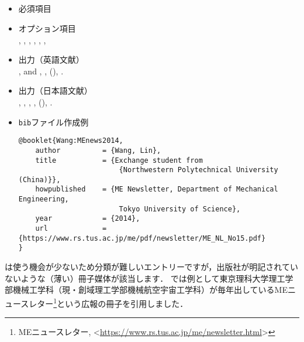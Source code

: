 \documentclass[a4paper,fleqn,uplatex,dvipdfmx]{jsarticle}
\begin{document}
\subsection{\ttbooklet}
\label{ssec:booklet}
\begin{screen}
    \begin{itemize}
        \item 必須項目 \\
        \tttitle
        \item オプション項目 \\
        \ttauthor, \tthowpublished, \ttaddress, \ttmonth, \ttyear, \ttnote, \ttkey
        \item 出力（英語文献） \\
            \colorbox[gray]{0.8}{\ttauthorf}, \colorbox[gray]{0.8}{\ttauthors} and \colorbox[gray]{0.8}{\ttauthort}, \colorbox[gray]{0.8}{\tttitle}, \colorbox[gray]{0.8}{\tthowpublished} (\colorbox[gray]{0.8}{\ttyear}), \colorbox[gray]{0.8}{\ttnote}.
        \item 出力（日本語文献） \\
            \colorbox[gray]{0.8}{\ttauthorf}, \colorbox[gray]{0.8}{\ttauthors}, \colorbox[gray]{0.8}{\ttauthort}, \colorbox[gray]{0.8}{\tttitle}, \colorbox[gray]{0.8}{\tthowpublished} (\colorbox[gray]{0.8}{\ttyear}), \colorbox[gray]{0.8}{\ttnote}.
        \item \verb|bib|ファイル作成例 \vspace{-3mm}
\begin{verbatim}
@booklet{Wang:MEnews2014,
    author          = {Wang, Lin},
    title           = {Exchange student from 
                        {Northwestern Polytechnical University (China)}},
    howpublished    = {ME Newsletter, Department of Mechanical Engineering, 
                        Tokyo University of Science},
    year            = {2014},
    url             = {https://www.rs.tus.ac.jp/me/pdf/newsletter/ME_NL_No15.pdf}
}
\end{verbatim}
    \end{itemize}
\end{screen}

\ttbooklet は使う機会が少ないため分類が難しいエントリーですが，出版社が明記されていないような（薄い）冊子媒体が該当します．
\JSMErepos では例として東京理科大学理工学部機械工学科（現・創域理工学部機械航空宇宙工学科）が毎年出しているMEニュースレター\footnote{MEニュースレター, \textless\url{https://www.rs.tus.ac.jp/me/newsletter.html}\textgreater}という広報の冊子を引用しました．
\end{document}
